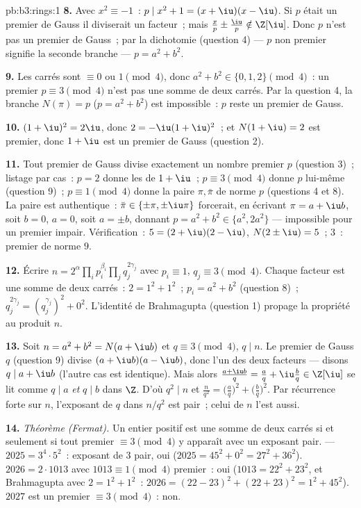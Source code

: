 \begin{solution}{pb:b3:rings:1}
\textbf{8.} Avec $x^2 \equiv -1$~: $p \mid x^2 + 1 = (x +
\iu)(x - \iu)$. Si $p$ était un premier de Gauss il diviserait
un facteur~; mais $\frac xp \pm \frac \iu p \notin \Z[\iu]$.
Donc $p$ n'est pas un premier de Gauss~; par la dichotomie
(question 4) --- $p$ non premier signifie la seconde branche ---
$p = a^2 + b^2$.

\textbf{9.} Les carrés sont $\equiv 0$ ou $1 \pmod 4$, donc $a^2
+ b^2 \in \{0, 1, 2\} \pmod 4$~: un premier $p \equiv 3 \pmod 4$
n'est pas une somme de deux carrés. Par la question 4, la
branche $N(\pi) = p$ ($p = a^2+b^2$) est impossible~: $p$ reste
un premier de Gauss.

\textbf{10.} $(1 + \iu)^2 = 2\iu$, donc $2 = -\iu(1 + \iu)^2$~;
et $N(1 + \iu) = 2$ est premier, donc $1 + \iu$ est un premier
de Gauss (question 2).

\textbf{11.} Tout premier de Gauss divise exactement un nombre
premier $p$ (question 3)~; listage par cas~: $p = 2$ donne les
 de $1 + \iu$~; $p \equiv 3 \pmod 4$ donne $p$ lui-même
(question 9)~; $p \equiv 1 \pmod 4$ donne la paire $\pi,
\bar\pi$ de norme $p$ (questions 4 et 8). La paire est
authentique~: $\bar\pi \in \{\pm\pi, \pm\iu\pi\}$ forcerait, en
écrivant $\pi = a + \iu b$, soit $b = 0$, $a = 0$, soit $a =
\pm b$, donnant $p = a^2 + b^2 \in \{a^2, 2a^2\}$ --- impossible
pour un premier impair. Vérification~: $5 = (2 + \iu)(2 -
\iu)$, $N(2\pm\iu) = 5$~; $3$~: premier de norme $9$.

\textbf{12.} Écrire $n = 2^{\alpha}\prod_i p_i^{\beta_i}
\prod_j q_j^{2\gamma_j}$ avec $p_i \equiv 1$, $q_j \equiv 3
\pmod 4$. Chaque facteur est une somme de deux carrés~: $2 =
1^2 + 1^2$~; $p_i = a^2 + b^2$ (question 8)~; $q_j^{2\gamma_j}
= (q_j^{\gamma_j})^2 + 0^2$. L'identité de Brahmagupta
(question 1) propage la propriété au produit $n$.

\textbf{13.} Soit $n = a^2 + b^2 = N(a + \iu b)$ et $q \equiv 3
\pmod 4$, $q \mid n$. Le premier de Gauss $q$ (question 9)
divise $(a + \iu b)(a - \iu b)$, donc l'un des deux facteurs ---
disons $q \mid a + \iu b$ (l'autre cas est identique). Mais alors
$\frac{a + \iu b}{q} = \frac aq + \iu \frac bq \in \Z[\iu]$ se
lit comme $q \mid a$ \emph{et} $q \mid b$ dans $\Z$. D'où $q^2
\mid n$ et $\frac n{q^2} = \bigl(\frac aq\bigr)^2 + \bigl(\frac
bq\bigr)^2$. Par récurrence forte sur $n$, l'exposant de $q$ dans
$n/q^2$ est pair~; celui de $n$ l'est aussi.

\textbf{14.} \emph{Théorème (Fermat).} Un entier positif est une
somme de deux carrés si et seulement si tout premier $\equiv 3
\pmod 4$ y apparaît avec un exposant pair. --- $2025 = 3^4
\cdot 5^2$~: exposant de $3$ pair, oui ($2025 = 45^2 + 0^2 =
27^2 + 36^2$). $2026 = 2 \cdot 1013$ avec $1013 \equiv 1 \pmod
4$ premier~: oui ($1013 = 22^2 + 23^2$, et Brahmagupta avec $2 =
1^2+1^2$~: $2026 = (22 - 23)^2 + (22 + 23)^2 = 1^2 + 45^2$).
$2027$ est un premier $\equiv 3 \pmod 4$~: non.


\end{solution}
